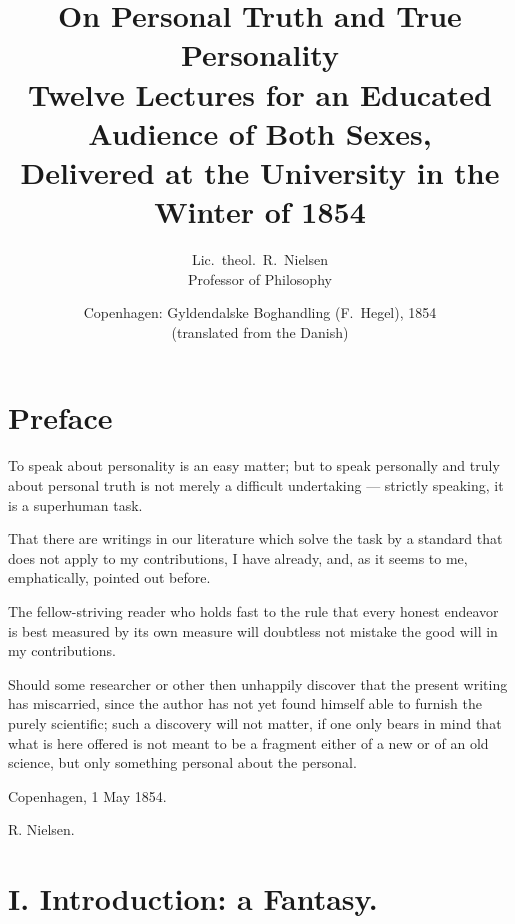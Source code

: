 \documentclass[12pt,a4paper]{book}
\title{\textbf{On Personal Truth and True Personality}\\[6pt]
  \large Twelve Lectures for an Educated Audience of Both Sexes,\\
  Delivered at the University in the Winter of 1854}
\author{Lic.\ theol.\ R.\ Nielsen\\\normalsize Professor of Philosophy}
\date{Copenhagen: Gyldendalske Boghandling (F.\ Hegel), 1854 \\ \normalsize (translated from the Danish)}
\begin{document}
\maketitle
\thispagestyle{empty}
\newpage

\tableofcontents
\newpage

\chapter*{Preface}
\label{ch:forord}

To speak about personality is an easy matter; but to speak personally and truly about personal truth is not merely a difficult undertaking — strictly speaking, it is a superhuman task.

That there are writings in our literature which solve the task by a standard that does not apply to my contributions, I have already, and, as it seems to me, emphatically, pointed out before.

The fellow-striving reader who holds fast to the rule that every honest endeavor is best measured by its own measure will doubtless not mistake the good will in my contributions.

Should some researcher or other then unhappily discover that the present writing has miscarried, since the author has not yet found himself able to furnish the purely scientific; such a discovery will not matter, if one only bears in mind that what is here offered is not meant to be a fragment either of a new or of an old science, but only something personal about the personal.

\begin{flushright}
Copenhagen, 1 May 1854.

R. Nielsen.
\end{flushright}

\chapter*{I. Introduction: a Fantasy.}
\label{ch:forel1}
\end{document}
